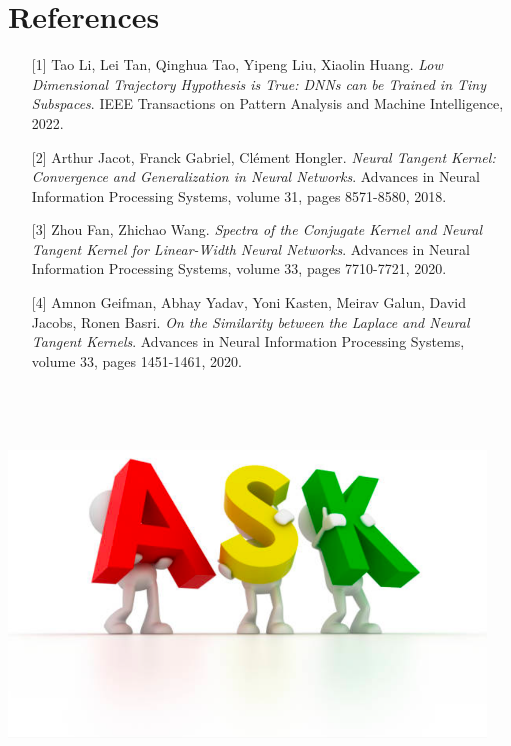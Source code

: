 \documentclass[t]{beamer}
\begin{document}
\section{References}
\begin{frame}
\begin{itemize}
\item [{[1]}]  Tao Li, Lei Tan, Qinghua Tao, Yipeng Liu, Xiaolin Huang. \textit{Low Dimensional Trajectory Hypothesis is True: DNNs can be Trained in Tiny Subspaces}. IEEE Transactions on Pattern Analysis and Machine Intelligence, 2022. \\
\vspace{0.5cm}
\item [{[2]}] Arthur Jacot, Franck Gabriel, Cl\'{e}ment Hongler. \textit{Neural Tangent Kernel: Convergence and Generalization in Neural Networks}. Advances in Neural Information Processing Systems, volume 31, pages 8571-8580, 2018. \\
\vspace{0.5cm}
\item [{[3]}]  Zhou Fan, Zhichao Wang. \textit{Spectra of the Conjugate Kernel and Neural Tangent Kernel for Linear-Width Neural Networks}. Advances in Neural Information Processing Systems, volume 33, pages 7710-7721, 2020. \\
\vspace{0.5cm}
\item [{[4]}]  Amnon Geifman, Abhay Yadav, Yoni Kasten, Meirav Galun, David Jacobs, Ronen Basri. \textit{On the Similarity between the Laplace and Neural Tangent Kernels}. Advances in Neural Information Processing Systems, volume 33,  pages 1451-1461, 2020.
\end{itemize}
\end{frame}


\section{}

\begin{frame}

\begin{center}

 \\
\ \\

\includegraphics[width=0.95\textwidth]{ask}

\end{center}

\end{frame}

\end{document}

